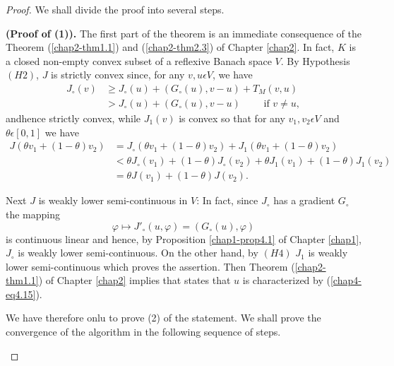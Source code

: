 \begin{proof}
We shall divide the proof into several steps.

\setcounter{step}{0}
\begin{step}\label{chap4-step1}
{\bf (Proof of (1)).} The first part of the theorem is an immediate consequence of the Theorem (\ref{chap2-thm1.1}) and (\ref{chap2-thm2.3}) of Chapter \ref{chap2}. In fact, $K$ is a closed non-empty convex subset of a reflexive Banach space $V$. By Hypothesis $(H2)$, $J$ is strictly convex since, for any $v, u \epsilon V$, we have
\begin{align*}
J_{\circ}(v) & \geq J_{\circ}(u) + (G_{\circ}(u), v-u) + T_{M}(v, u)\\
& > J_{\circ}(u) + (G_{\circ}(u), v-u) \qquad \text{ if } v \neq u,
\end{align*}
and\pageoriginale hence strictly convex, while $J_{1}(v)$ is convex so that for any $v_{1}, v_{2} \epsilon V$ and $\theta \epsilon [0, 1]$ we have
\begin{align*}
J(\theta v_{1} + (1-\theta)v_{2}) & = J_{\circ} (\theta v_{1} + (1-\theta)v_{2}) + J_{1}(\theta v_{1} + (1-\theta)v_{2})\\
& < \theta J_{\circ}(v_{1}) + (1-\theta) J_{\circ}(v_{2}) + \theta J_{1} (v_{1}) + (1-\theta)J_{1}(v_{2})\\
& = \theta J(v_{1}) + (1 - \theta)J(v_{2}).
\end{align*}

Next $J$ is weakly lower semi-continuous in $V$: In fact, since $J_{\circ}$ has a gradient $G_{\circ}$ the mapping
$$
\varphi \mapsto J'_{\circ}(u, \varphi) = (G_{\circ}(u), \varphi)
$$
is continuous linear and hence, by Proposition \ref{chap1-prop4.1} of Chapter \ref{chap1}, $J_{\circ}$ is weakly lower semi-continuous. On the other hand, by $(H4)$ $J_{1}$ is weakly lower semi-continuous which proves the assertion. Then Theorem (\ref{chap2-thm1.1}) of Chapter \ref{chap2} implies that states that $u$ is characterized by (\ref{chap4-eq4.15}).

We have therefore onlu to prove (2) of the statement. We shall prove the convergence of the algorithm in the following sequence of steps.
\end{step}


\end{proof}
